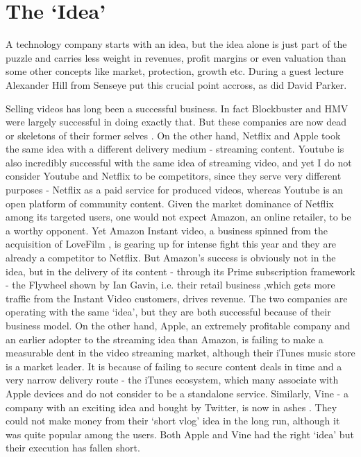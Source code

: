 \documentclass[twocolumn]{bmcart}%
\begin{document}

\section*{The `Idea'}
A technology company starts with an idea, but the idea alone is just part of the puzzle and carries less weight in revenues, profit margins or even valuation than some other concepts like market, protection, growth etc. During a guest lecture Alexander Hill from Senseye put this crucial point accross, as did David Parker.\\

\par Selling videos has long been a successful business. In fact Blockbuster and HMV were largely successful in doing exactly that. But these companies are now dead \cite{gavinjackson2013} or skeletons of their former selves \cite{markwembridgeclaerbarrett2011}. On the other hand, Netflix and Apple took the same idea with a different delivery medium - streaming content. Youtube is also incredibly successful with the same idea of streaming video, and yet I do not consider Youtube and Netflix to be competitors, since they serve very different purposes - Netflix as a paid service for produced videos, whereas Youtube is an open platform of community content. Given the market dominance of Netflix among its targeted users, one would not expect Amazon, an online retailer, to be a worthy opponent. Yet Amazon Instant video, a business spinned from the acquisition of LoveFilm \cite{timbradshaw2011}, is gearing up for intense fight this year \cite{madhumitamurgia2017} and they are already a competitor to Netflix. But Amazon's success is obviously not in the idea, but in the delivery of its content - through its Prime subscription framework - the Flywheel shown by Ian Gavin, i.e. their retail business ,which gets more traffic from the Instant Video customers, drives revenue. The two companies are operating with the same `idea', but they are both successful because of their business model. On the other hand, Apple, an extremely profitable company and an earlier adopter to the streaming idea than Amazon, is failing to make a measurable dent in the video streaming market, although their iTunes music store is a market leader. It is because of failing to secure content deals in time \cite{matthewgarrahan2017} and a very narrow delivery route - the iTunes ecosystem, which many associate with Apple devices and do not consider to be a standalone service. Similarly, Vine - a company with an exciting idea and bought by Twitter, is now in ashes \cite{chrisfoxx2016}. They could not make money from their `short vlog' idea in the long run, although it was quite popular among the users. Both Apple and Vine had the right `idea' but their execution has fallen short.\\
\end{document}
